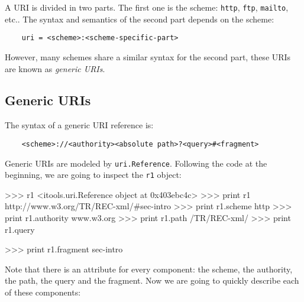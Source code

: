 A URI is divided in two parts. The first one is the scheme: {\tt http},
{\tt ftp}, {\tt mailto}, etc.. The syntax and semantics of the second
part depends on the scheme:

\begin{verbatim}
    uri = <scheme>:<scheme-specific-part>
\end{verbatim}

However, many schemes share a similar syntax for the second part, these
URIs are known as {\em generic URIs}.

\subsection{Generic URIs}

The syntax of a generic URI reference is:

\begin{verbatim}
    <scheme>://<authority><absolute path>?<query>#<fragment>
\end{verbatim}

Generic URIs are modeled by {\tt uri.Reference}. Following the code at the
beginning, we are going to inspect the {\tt r1} object:

\begin{code}
    >>> r1
    <itools.uri.Reference object at 0x403ebc4c>
    >>> print r1
    http://www.w3.org/TR/REC-xml/#sec-intro
    >>> print r1.scheme
    http
    >>> print r1.authority
    www.w3.org
    >>> print r1.path     
    /TR/REC-xml/
    >>> print r1.query

    >>> print r1.fragment
    sec-intro
\end{code}

Note that there is an attribute for every component: the scheme, the
authority, the path, the query and the fragment. Now we are going to
quickly describe each of these components:

